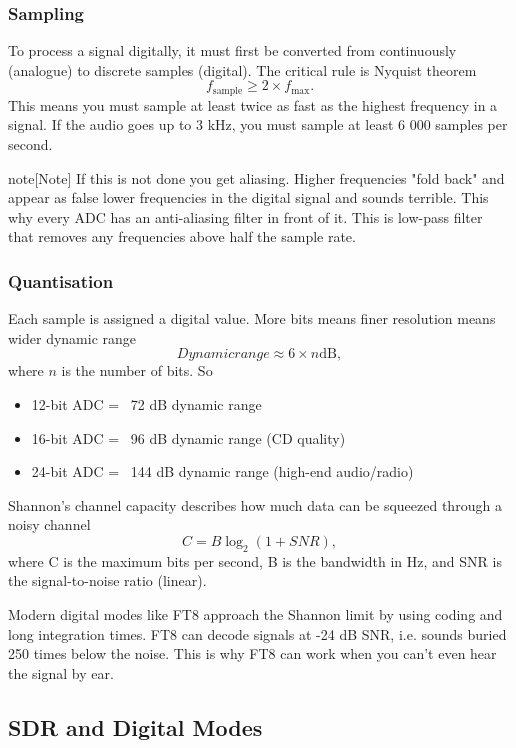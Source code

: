\documentclass{article}
\begin{document}
\subsubsection{Sampling}
To process a signal digitally, it must first be converted from continuously (analogue) to discrete samples (digital). The critical rule is Nyquist theorem
\[
    f_{\text{sample}}\geq 2\times f_{\text{max}}.
\]
This means you must sample at least twice as fast as the highest frequency in a signal. If the audio goes up to 3 kHz, you must sample at least 6 000 samples per second.

\begin{callout}{note}[Note]
    If this is not done you get aliasing. Higher frequencies "fold back" and appear as false lower frequencies in the digital signal and sounds terrible. This why every ADC has an anti-aliasing filter in front of it. This is low-pass filter that removes any frequencies above half the sample rate.
\end{callout}

\subsubsection{Quantisation}
Each sample is assigned a digital value. More bits means finer resolution means wider dynamic range
\[
    Dynamic range \approx 6\times n \text{dB},
\]
where $n$ is the number of bits. So
\begin{itemize}
    \item 12-bit ADC = ~72 dB dynamic range
    \item 16-bit ADC = ~96 dB dynamic range (CD quality)
    \item 24-bit ADC = ~144 dB dynamic range (high-end audio/radio)
\end{itemize}

Shannon's channel capacity describes how much data can be squeezed through a noisy channel
\[
    C=B \log_2(1+SNR),
\]
where C is the maximum bits per second, B is the bandwidth in Hz, and SNR is the signal-to-noise ratio (linear).

Modern digital modes like FT8 approach the Shannon limit by using coding and long integration times. FT8 can decode signals at -24 dB SNR, i.e. sounds buried 250 times below the noise. This is why FT8 can work when you can't even hear the signal by ear.

\subsection{SDR and Digital Modes}
\end{document}
